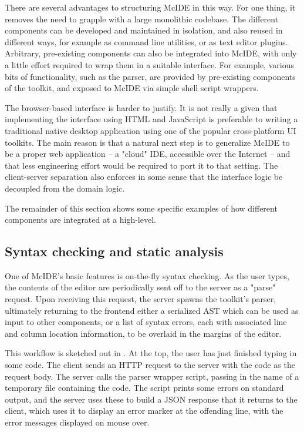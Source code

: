 There are several advantages to structuring McIDE in this way. For one thing,
it removes the need to grapple with a large monolithic codebase. The different
components can be developed and maintained in isolation, and also reused in
different ways, for example as command line utilities, or as text editor
plugins. Arbitrary, pre-existing components can also be integrated into McIDE,
with only a little effort required to wrap them in a suitable interface. For
example, various bits of functionality, such as the parser, are provided by
pre-existing components of the \mclab toolkit, and exposed to McIDE via simple
shell script wrappers.

The browser-based interface is harder to justify. It is not really a given that
implementing the interface using HTML and JavaScript is preferable to writing a
traditional native desktop application using one of the popular cross-platform
UI toolkits. The main reason is that a natural next step is to generalize McIDE
to be a proper web application -- a "cloud" IDE, accessible over the Internet --
and that less engineering effort would be required to port it to that setting.
The client-server separation also enforces in some sense that the interface
logic be decoupled from the domain logic.

The remainder of this section shows some specific examples of how different
components are integrated at a high-level.

\subsection{Syntax checking and static analysis}

One of McIDE's basic features is on-the-fly syntax checking. As the user types,
the contents of the editor are periodically sent off to the server as a "parse"
request. Upon receiving this request, the server spawns the \mclab toolkit's
\matlab parser, ultimately returning to the frontend either a serialized AST
which can be used as input to other components, or a list of syntax errors,
each with associated line and column location information, to be overlaid in
the margins of the editor.

This workflow is sketched out in . At the top, the
user has just finished typing in some code. The client sends an HTTP request to
the server with the code as the request body. The server calls the parser
wrapper script, passing in the name of a temporary file containing the code.
The script prints some errors on standard output, and the server uses these to
build a JSON response that it returns to the client, which uses it to display
an error marker at the offending line, with the error messages displayed on
mouse over.

